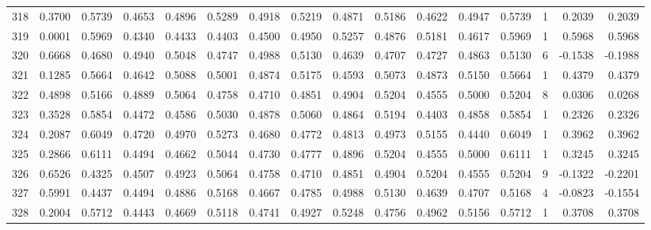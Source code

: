 \begin{tabular}{lrrrrrrrrrrrrrrr}
318 &      0.3700 &  0.5739 &  0.4653 &  0.4896 &  0.5289 &  0.4918 &  0.5219 &  0.4871 &  0.5186 &  0.4622 &   0.4947 &     0.5739 &      1 &                    0.2039 &                     0.2039 \\
319 &      0.0001 &  0.5969 &  0.4340 &  0.4433 &  0.4403 &  0.4500 &  0.4950 &  0.5257 &  0.4876 &  0.5181 &   0.4617 &     0.5969 &      1 &                    0.5968 &                     0.5968 \\
320 &      0.6668 &  0.4680 &  0.4940 &  0.5048 &  0.4747 &  0.4988 &  0.5130 &  0.4639 &  0.4707 &  0.4727 &   0.4863 &     0.5130 &      6 &                   -0.1538 &                    -0.1988 \\
321 &      0.1285 &  0.5664 &  0.4642 &  0.5088 &  0.5001 &  0.4874 &  0.5175 &  0.4593 &  0.5073 &  0.4873 &   0.5150 &     0.5664 &      1 &                    0.4379 &                     0.4379 \\
322 &      0.4898 &  0.5166 &  0.4889 &  0.5064 &  0.4758 &  0.4710 &  0.4851 &  0.4904 &  0.5204 &  0.4555 &   0.5000 &     0.5204 &      8 &                    0.0306 &                     0.0268 \\
323 &      0.3528 &  0.5854 &  0.4472 &  0.4586 &  0.5030 &  0.4878 &  0.5060 &  0.4864 &  0.5194 &  0.4403 &   0.4858 &     0.5854 &      1 &                    0.2326 &                     0.2326 \\
324 &      0.2087 &  0.6049 &  0.4720 &  0.4970 &  0.5273 &  0.4680 &  0.4772 &  0.4813 &  0.4973 &  0.5155 &   0.4440 &     0.6049 &      1 &                    0.3962 &                     0.3962 \\
325 &      0.2866 &  0.6111 &  0.4494 &  0.4662 &  0.5044 &  0.4730 &  0.4777 &  0.4896 &  0.5204 &  0.4555 &   0.5000 &     0.6111 &      1 &                    0.3245 &                     0.3245 \\
326 &      0.6526 &  0.4325 &  0.4507 &  0.4923 &  0.5064 &  0.4758 &  0.4710 &  0.4851 &  0.4904 &  0.5204 &   0.4555 &     0.5204 &      9 &                   -0.1322 &                    -0.2201 \\
327 &      0.5991 &  0.4437 &  0.4494 &  0.4886 &  0.5168 &  0.4667 &  0.4785 &  0.4988 &  0.5130 &  0.4639 &   0.4707 &     0.5168 &      4 &                   -0.0823 &                    -0.1554 \\
328 &      0.2004 &  0.5712 &  0.4443 &  0.4669 &  0.5118 &  0.4741 &  0.4927 &  0.5248 &  0.4756 &  0.4962 &   0.5156 &     0.5712 &      1 &                    0.3708 &                     0.3708 \\

\end{tabular}
